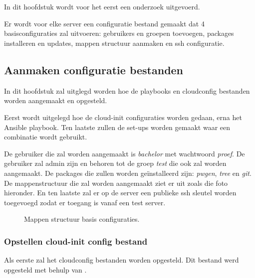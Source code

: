 \chapter{}
\label{ch:basisconf}
In dit hoofdstuk wordt voor het eerst een onderzoek uitgevoerd. 

Er wordt voor elke server een configuratie bestand gemaakt dat 4 basisconfiguraties zal uitvoeren: gebruikers en groepen toevoegen, packages installeren en updates, mappen structuur aanmaken en ssh configuratie. 


\section{Aanmaken configuratie bestanden}
In dit hoofdstuk zal uitglegd worden hoe de playbooks en cloudconfig bestanden worden aangemaakt en opgesteld. 

Eerst wordt uitgelegd hoe de cloud-init configuraties worden gedaan, erna het Ansible playbook. Ten laatste zullen de set-ups worden gemaakt waar een combinatie wordt gebruikt.

De gebruiker die zal worden aangemaakt is \textit{bachelor} met wachtwoord \textit{proef}. De gebruiker zal admin zijn en behoren tot de groep \textit{test} die ook zal worden aangemaakt. De packages die zullen worden geïnstalleerd zijn: \textit{pwgen}, \textit{tree} en \textit{git}. De mappenstructuur die zal worden aangemaakt ziet er uit zoals die foto hieronder. En ten laatste zal er op de server een publieke ssh sleutel worden toegevoegd zodat er toegang is vanaf een test server.

\begin{figure}[!htb]
	\caption{Mappen structuur basis configuraties.}
	\label{fig:mappen}
\end{figure}
\subsection{Opstellen cloud-init config bestand}
Als eerste zal het cloudconfig bestanden worden opgesteld. Dit bestand werd opgesteld met behulp van \autocite{clouddocs}.

